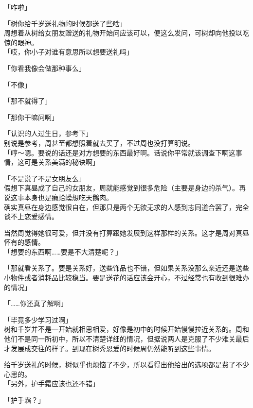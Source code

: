 「咋啦」

「树你给千岁送礼物的时候都送了些啥」\\

周想着从树给女朋友赠送的礼物开始问应该可以，便这么发问，可树却向他投以吃惊的眼神。\\

「哎，你小子对谁有意思所以想要送礼吗」

「你看我像会做那种事么」

「不像」

「那不就得了」

「那你干嘛问啊」

「认识的人过生日，参考下」\\

别说是参考，周甚至都想照着就去买了，不过周也没打算明说。\\

「哼～嗯。要说的话还是对方想要的东西最好啊。话说你平常就该调查下啊这事情，这可是关系美满的秘诀啊」

「不是说了不是女朋友么」\\

假想下真昼成了自己的女朋友，周就能感觉到很多危险（主要是身边的杀气）。再说这事本身也是癞蛤蟆想吃天鹅肉。\\

确实真昼在身边感觉很自在，但那只是两个无欲无求的人感到志同道合罢了，完全谈不上恋爱感情。

当然周觉得她很可爱，但并没有打算跟她发展到这样那样的关系。这才是周对真昼怀有的感情。\\

「想要的东西啊……要是不大清楚呢？」

「那就看关系了。要是关系好，送些饰品也不错，但如果关系没那么亲近还是送些小物件或者消耗品比较稳当。要是送花的话应该会开心，不过经常也有收到很难办的情况」

「……你还真了解啊」

「毕竟多少学习过啊」\\

树和千岁并不是一开始就相思相爱，好像是初中的时候开始慢慢拉近关系的。周和他们不是同一所初中，所以不清楚详细的情况，但据说两人是克服了不少难关最后才发展成交往的样子。到现在树秀恩爱的时候周仍然能听到这些事情。

给千岁送礼的时候，树似乎也烦恼了不少，所以看得出他给出的选项都是费了不少心思的。\\

「另外，护手霜应该也还不错」

「护手霜？」\\


